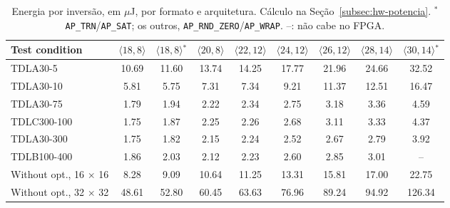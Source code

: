 \begin{table}[htbp]
\caption[Energia por inversão, em $\mu$J, por formato e arquitetura.]{Energia por inversão, em $\mu$J, por formato e arquitetura. Cálculo na Seção~\ref{subsec:hw-potencia}. $^{*}$\texttt{AP\_TRN}/\texttt{AP\_SAT}; os outros, \texttt{AP\_RND\_ZERO}/\texttt{AP\_WRAP}. --: não cabe no FPGA.}
\label{tab:energia-inversao}
\vspace{4pt} %
\centering
\footnotesize
\renewcommand{\arraystretch}{1.2}
\setlength{\tabcolsep}{3pt}
\begin{tabular}{lcccccccc}
\toprule
\textbf{Test condition} & \textbf{$\langle 18,8\rangle$} & \textbf{$\langle 18,8\rangle$$^{*}$} & \textbf{$\langle 20,8\rangle$} & \textbf{$\langle 22,12\rangle$} & \textbf{$\langle 24,12\rangle$} & \textbf{$\langle 26,12\rangle$} & \textbf{$\langle 28,14\rangle$} & \textbf{$\langle 30,14\rangle$$^{*}$} \\
\midrule
TDLA30-5 & 10.69 & 11.60 & 13.74 & 14.25 & 17.77 & 21.96 & 24.66 & 32.52 \\
TDLA30-10 & 5.81 & 5.75 & 7.31 & 7.34 & 9.21 & 11.37 & 12.51 & 16.47 \\
TDLA30-75 & 1.79 & 1.94 & 2.22 & 2.34 & 2.75 & 3.18 & 3.36 & 4.59 \\
TDLC300-100 & 1.75 & 1.87 & 2.25 & 2.26 & 2.68 & 3.11 & 3.33 & 4.37 \\
TDLA30-300 & 1.75 & 1.82 & 2.15 & 2.24 & 2.52 & 2.67 & 2.79 & 3.92 \\
TDLB100-400 & 1.86 & 2.03 & 2.12 & 2.23 & 2.60 & 2.85 & 3.01 & -- \\
\midrule
Without opt., 16 $\times$ 16 & 8.28 & 9.09 & 10.64 & 11.25 & 13.31 & 15.81 & 17.00 & 22.75 \\
Without opt., 32 $\times$ 32 & 48.61 & 52.80 & 60.45 & 63.63 & 76.96 & 89.24 & 94.92 & 126.34 \\
\bottomrule
\end{tabular}
\vspace{4pt}
\end{table}

